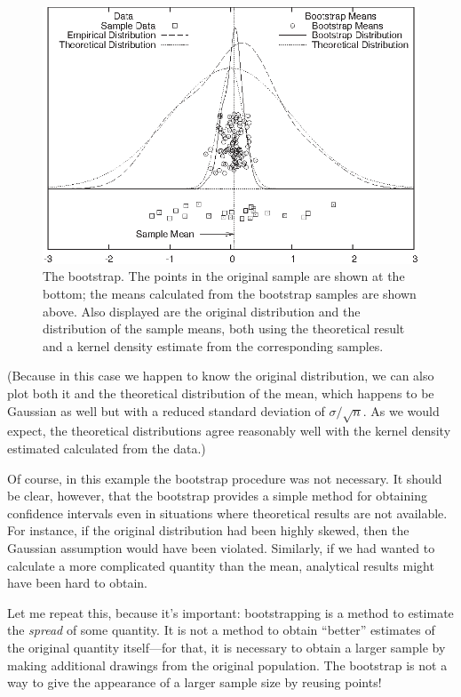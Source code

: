 \begin{figure}
  \centerline{\includegraphics{img/bootstrap}}
  \caption{The bootstrap. The points in the original sample are shown
    at the bottom; the means calculated from the bootstrap samples are
    shown above. Also displayed are the original distribution and the
    distribution of the sample means, both using the theoretical result
    and a kernel density estimate from the corresponding samples.}
  \label{fig:bootstrap}\vspace*{-6pt}
\end{figure}

(Because in this case we happen to know the original distribution, we
can also plot both it and the theoretical distribution of the mean,\vadjust{\pagebreak}
which happens to be Gaussian as well but with a reduced standard
deviation of $\sigma/\sqrt{n}$. As we would expect, the theoretical
distributions agree reasonably well with the kernel density estimated
calculated from the data.)

Of course, in this example the bootstrap procedure was not necessary.
It should be clear, however, that the bootstrap provides a simple
method for obtaining confidence intervals even in situations where
theoretical results are not available. For instance, if the original
distribution had been highly skewed, then the Gaussian assumption
would have been violated.  Similarly, if we had wanted to calculate a
more complicated quantity than the mean, analytical results might have
been hard to obtain.

Let me repeat this, because it's important: bootstrapping is a method
to estimate the \emph{spread} of some quantity. It is not a method to
obtain ``better'' estimates of the original quantity itself---for
that, it is necessary to obtain a larger sample by making additional
drawings from the original population.  The bootstrap is not a way to
give the appearance of a larger sample size by reusing points!

